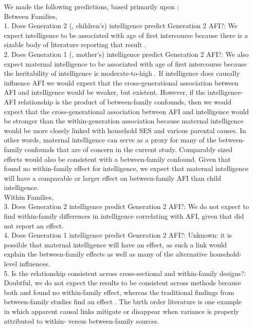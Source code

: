 We made the following predictions, based primarily upon \citet{harden2011don}:\\ 
Between Families,\\
1. Does Generation 2 (\ie, children's) intelligence predict Generation 2 AFI?: We expect intelligence to be associated with age of first intercourse because there is a sizable body of literature reporting that result \citep{kirby2002effective, manlove1998influence, raffaelli2003sexual}.\\ 
2. Does Generation 1 (\ie, mother's) intelligence predict Generation 2 AFI?: We also expect maternal intelligence to be associated with age of first intercourse because the heritability of intelligence is moderate-to-high \citep{Bouchard2004,devlin1997heritability}. If intelligence does causally influence AFI we would expect that the cross-generational association between AFI and intelligence would be weaker, but existent. However, if the intelligence-AFI relationship is the product of between-family confounds, then we would expect that the cross-generational association between AFI and intelligence would be stronger than the within-generation association because maternal intelligence would be more closely linked with household SES and various parental causes. In other words, maternal intelligence can serve as a proxy for many of the between-family confounds that are of concern in the current study. Comparably sized effects would also be consistent with a between-family confound. Given that \citet{harden2011don} found no within-family effect for intelligence, we expect that maternal intelligence will have a comparable or larger effect on between-family AFI than child intelligence.\\
Within Families,\\
3. Does Generation 2 intelligence predict Generation 2 AFI?: We do not expect to find within-family differences in intelligence correlating with AFI, given that \citet{harden2011don} did not report an effect.\\
4. Does Generation 1 intelligence predict Generation 2 AFI?: Unknown: it is possible that maternal intelligence will have an effect, as such a link would explain the between-family effects as well as many of the alternative household-level influences.\\
5. Is the relationship consistent across cross-sectional and within-family designs?: Doubtful, we do not expect the results to be consistent across methods because both \citet{harden2011don} and \citet{Meredith2013} found no within-family effect, whereas the traditional findings from between-family studies find an effect \citep{kirby2002effective, manlove1998influence, raffaelli2003sexual}. The birth order literature is one example in which apparent causal links mitigate or disappear when variance is properly attributed to within- versus between-family sources.